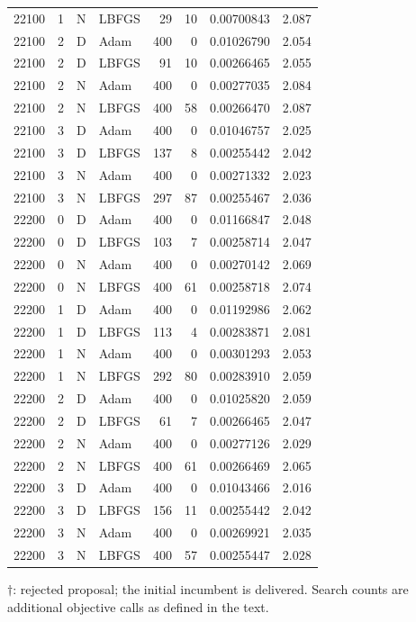 \begin{longtable}{rrllrrrr}
22100 & 1 & N & LBFGS & 29 & 10 & 0.00700843 & 2.087\\
22100 & 2 & D & Adam & 400 & 0 & 0.01026790 & 2.054\\
22100 & 2 & D & LBFGS & 91 & 10 & 0.00266465 & 2.055\\
22100 & 2 & N & Adam & 400 & 0 & 0.00277035 & 2.084\\
22100 & 2 & N & LBFGS & 400 & 58 & 0.00266470 & 2.087\\
22100 & 3 & D & Adam & 400 & 0 & 0.01046757 & 2.025\\
22100 & 3 & D & LBFGS & 137 & 8 & 0.00255442 & 2.042\\
22100 & 3 & N & Adam & 400 & 0 & 0.00271332 & 2.023\\
22100 & 3 & N & LBFGS & 297 & 87 & 0.00255467 & 2.036\\
22200 & 0 & D & Adam & 400 & 0 & 0.01166847 & 2.048\\
22200 & 0 & D & LBFGS & 103 & 7 & 0.00258714 & 2.047\\
22200 & 0 & N & Adam & 400 & 0 & 0.00270142 & 2.069\\
22200 & 0 & N & LBFGS & 400 & 61 & 0.00258718 & 2.074\\
22200 & 1 & D & Adam & 400 & 0 & 0.01192986 & 2.062\\
22200 & 1 & D & LBFGS & 113 & 4 & 0.00283871 & 2.081\\
22200 & 1 & N & Adam & 400 & 0 & 0.00301293 & 2.053\\
22200 & 1 & N & LBFGS & 292 & 80 & 0.00283910 & 2.059\\
22200 & 2 & D & Adam & 400 & 0 & 0.01025820 & 2.059\\
22200 & 2 & D & LBFGS & 61 & 7 & 0.00266465 & 2.047\\
22200 & 2 & N & Adam & 400 & 0 & 0.00277126 & 2.029\\
22200 & 2 & N & LBFGS & 400 & 61 & 0.00266469 & 2.065\\
22200 & 3 & D & Adam & 400 & 0 & 0.01043466 & 2.016\\
22200 & 3 & D & LBFGS & 156 & 11 & 0.00255442 & 2.042\\
22200 & 3 & N & Adam & 400 & 0 & 0.00269921 & 2.035\\
22200 & 3 & N & LBFGS & 400 & 57 & 0.00255447 & 2.028\\
\bottomrule\end{longtable}
\normalsize $\dagger$: rejected proposal; the initial incumbent is delivered. Search counts are additional objective calls as defined in the text.
